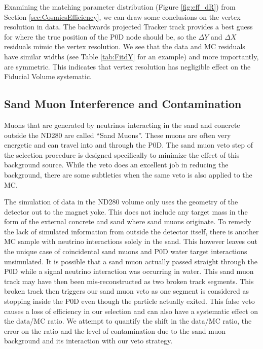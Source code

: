 Examining the matching parameter distribution (Figure \ref{fig:eff_dR}) from Section \ref{sec:CosmicsEfficiency}, we can draw some conclusions on the vertex resolution in data. The backwards projected Tracker track provides a best guess for where the true position of the P0D node should be, so the $\Delta Y$ and $\Delta X$ residuals mimic the vertex resolution. We see that the data and MC residuals have similar widths (see Table \ref{tab:FitdY} for an example) and more importantly, are symmetric. This indicates that vertex resolution has negligible effect on the Fiducial Volume systematic.

\subsection{Sand Muon Interference and Contamination}
\label{sec:sandintsys}

Muons that are generated by neutrinos interacting in the sand and concrete outside the ND280 are called ``Sand Muons''. These muons are often very energetic and can travel into and through the P0D. The sand muon veto step of the selection procedure is designed specifically to minimize the effect of this background source. While the veto does an excellent job in reducing the background, there are some subtleties when the same veto is also applied to the MC.

The simulation of data in the ND280 volume only uses the geometry of the detector out to the magnet yoke. This does not include any target mass in the form of the external concrete and sand where sand muons originate. To remedy the lack of simulated information from outside the detector itself, there is another MC sample with neutrino interactions solely in the sand. This however leaves out the unique case of coincidental sand muons and P0D water target interactions unsimulated. It is possible that a sand muon actually passed straight through the P0D while a signal neutrino interaction was occurring in water. This sand muon track may have then been mis-reconstructed as two broken track segments. This broken track then triggers our sand muon veto as one segment is considered as stopping inside the P0D even though the particle actually exited. This false veto causes a loss of efficiency in our selection and can also have a systematic effect on the data/MC ratio. We attempt to quantify the shift in the data/MC ratio, the error on the ratio and the level of contamination due to the sand muon background and its interaction with our veto strategy.

